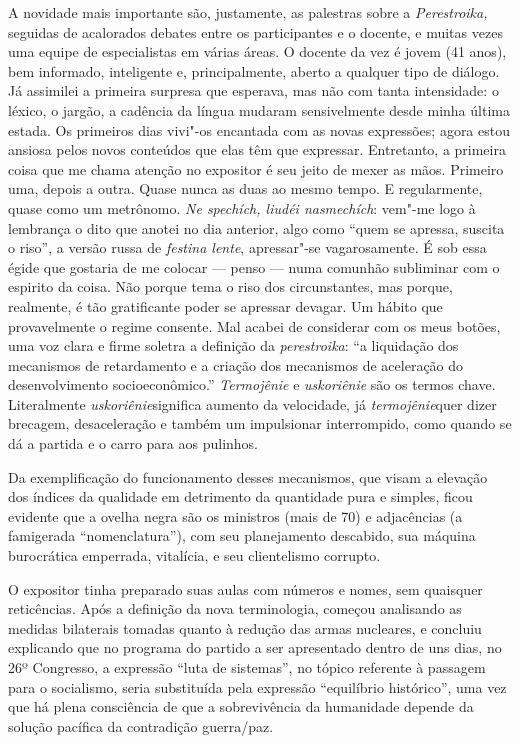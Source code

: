 A novidade mais importante são, justamente, as palestras sobre a
\emph{Perestroika,} seguidas de acalorados debates entre os
participantes e o docente, e muitas vezes uma equipe de especialistas em
várias áreas. O docente da vez é jovem (41 anos), bem informado,
inteligente e, principalmente, aberto a qualquer tipo de diálogo. Já
assimilei a primeira surpresa que esperava, mas não com tanta
intensidade: o léxico, o jargão, a cadência da língua mudaram
sensivelmente desde minha última estada. Os primeiros dias vivi"-os
encantada com as novas expressões; agora estou ansiosa pelos novos
conteúdos que elas têm que expressar. Entretanto, a primeira coisa que
me chama atenção no expositor é seu jeito de mexer as mãos. Primeiro
uma, depois a outra. Quase nunca as duas ao mesmo tempo. E regularmente,
quase como um metrônomo. \emph{Ne spechích, liudéi nasmechích}: vem"-me
logo à lembrança o dito que anotei no dia anterior, algo como ``quem se
apressa, suscita o riso'', a versão russa de \emph{festina lente},
apressar"-se vagarosamente. É sob essa égide que gostaria de me colocar
--- penso --- numa comunhão subliminar com o espirito da coisa. Não porque
tema o riso dos circunstantes, mas porque, realmente, é tão gratificante
poder se apressar devagar. Um hábito que provavelmente o regime
consente. Mal acabei de considerar com os meus botões, uma voz clara e
firme soletra a definição da \emph{perestroika}: ``a liquidação dos
mecanismos de retardamento e a criação dos mecanismos de aceleração do
desenvolvimento socioeconômico.'' \emph{Termojênie} e \emph{uskoriênie}
são os termos chave. Literalmente \emph{uskoriênie}significa aumento da
velocidade, já \emph{termojênie}quer dizer brecagem, desaceleração e
também um impulsionar interrompido, como quando se dá a partida e o
carro para aos pulinhos.

Da exemplificação do funcionamento desses mecanismos, que visam a
elevação dos índices da qualidade em detrimento da quantidade pura e
simples, ficou evidente que a ovelha negra são os ministros (mais de 70)
e adjacências (a famigerada ``nomenclatura''), com seu planejamento
descabido, sua máquina burocrática emperrada, vitalícia, e seu
clientelismo corrupto.

O expositor tinha preparado suas aulas com números e nomes, sem
quaisquer reticências. Após a definição da nova terminologia, começou
analisando as medidas bilaterais tomadas quanto à redução das armas
nucleares, e concluiu explicando que no programa do partido a ser
apresentado dentro de uns dias, no 26º Congresso, a expressão ``luta de
sistemas'', no tópico referente à passagem para o socialismo, seria
substituída pela expressão ``equilíbrio histórico'', uma vez que há
plena consciência de que a sobrevivência da humanidade depende da
solução pacífica da contradição guerra/paz.


